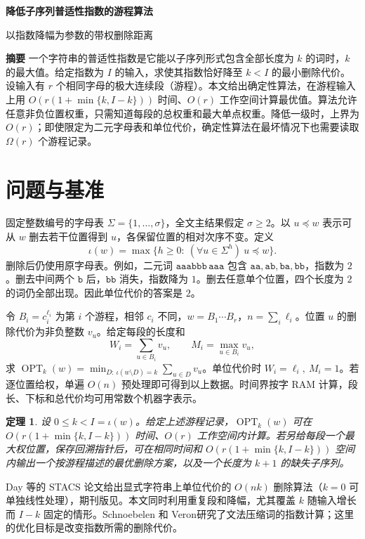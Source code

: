 \documentclass[UTF8,11pt,a4paper,fontset=fandol]{ctexart}
\theoremstyle{zh}
\newtheorem{theorem}{定理}
\newcommand{\ind}{\iota}
\newcommand{\cost}{\operatorname{OPT}}
\newcommand{\sig}{\Sigma}
\begin{document}
\begin{center}
{\LARGE\bfseries 降低子序列普适性指数的游程算法\par}
\vspace{.55em}
{\large 以指数降幅为参数的带权删除距离\par}
\end{center}

\noindent\textbf{摘要}\quad
一个字符串的普适性指数是它能以子序列形式包含全部长度为 $k$ 的词时，$k$ 的最大值。给定指数为 $I$ 的输入，求使其指数恰好降至 $k<I$ 的最小删除代价。设输入有 $r$ 个相同字母的极大连续段（游程）。本文给出确定性算法，在游程输入上用 $O(r(1+\min\{k,I-k\}))$ 时间、$O(r)$ 工作空间计算最优值。算法允许任意非负位置权重，只需知道每段的总权重和最大单点权重。降低一级时，上界为 $O(r)$；即使限定为二元字母表和单位代价，确定性算法在最坏情况下也需要读取 $\Omega(r)$ 个游程记录。

\section{问题与基准}
固定整数编号的字母表 $\sig=\{1,\ldots,\sigma\}$，全文主结果假定 $\sigma\ge2$。以 $u\preceq w$ 表示可从 $w$ 删去若干位置得到 $u$，各保留位置的相对次序不变。定义
\[
  \ind(w)=\max\{h\ge0:\ (\forall u\in\sig^h)\ u\preceq w\}.
\]
删除后仍使用原字母表。例如，二元词 $\mathtt{aaabbb\,aaa}$ 包含 $\mathtt{aa,ab,ba,bb}$，指数为 $2$。删去中间两个 $\mathtt b$ 后，$\mathtt{bb}$ 消失，指数降为 $1$。删去任意单个位置，四个长度为 $2$ 的词仍全部出现。因此单位代价的答案是 $2$。

令 $B_i=c_i^{\ell_i}$ 为第 $i$ 个游程，相邻 $c_i$ 不同，$w=B_1\cdots B_r$，$n=\sum_i\ell_i$。位置 $u$ 的删除代价为非负整数 $v_u$。给定每段的长度和
\[
 W_i=\sum_{u\in B_i}v_u,\qquad M_i=\max_{u\in B_i}v_u ,
\]
求 $\cost_k(w)=\min_{D:\,\ind(w\setminus D)=k}\sum_{u\in D}v_u$。单位代价时 $W_i=\ell_i,\ M_i=1$。若逐位置给权，单遍 $O(n)$ 预处理即可得到以上数据。时间界按字 RAM 计算，段长、下标和总代价均可用常数个机器字表示。

\begin{theorem}\label{thm:main}
设 $0\le k<I=\ind(w)$。给定上述游程记录，$\cost_k(w)$ 可在 $O(r(1+\min\{k,I-k\}))$ 时间、$O(r)$ 工作空间内计算。若另给每段一个最大权位置，保存回溯指针后，可在相同时间和 $O(r(1+\min\{k,I-k\}))$ 空间内输出一个按游程描述的最优删除方案，以及一个长度为 $k+1$ 的缺失子序列。
\end{theorem}

Day 等的 STACS 论文\cite[定理 4.4]{day}给出显式字符串上单位代价的 $O(nk)$ 删除算法（$k=0$ 可单独线性处理），期刊版见\cite{journal}。本文同时利用重复段和降幅，尤其覆盖 $k$ 随输入增长而 $I-k$ 固定的情形。Schnoebelen 和 Veron\cite{compressed}研究了文法压缩词的指数计算；这里的优化目标是改变指数所需的删除代价。
\end{document}
